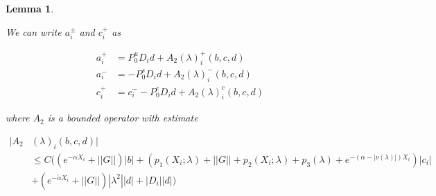 \documentclass[12pt]{article}
\newtheorem{lemma}{Lemma}
\begin{document}
\begin{lemma}\label{inv2}







We can write $a_i^\pm$ and $c_i^+$ as 

\begin{align*}
a_i^+ &= P^u_0 D_i d + A_2(\lambda)_i^+(b, c, d) \\
a_i^- &= -P^s_0 D_i d + A_2(\lambda)_i^-(b, c, d) \\
c_i^+ &= c_i^- - P^c_0 D_i d + A_2(\lambda)_i^c(b, c, d)
\end{align*}

where $A_2$ is a bounded operator with estimate

\begin{align*}
|A_2&(\lambda)_i(b, c, d)| \\
&\leq C \Big( (e^{-\alpha X_i} + ||G||)|b| + (p_1(X_i; \lambda) + ||G|| + p_2(X_i; \lambda) + p_3(\lambda) + e^{-(\alpha - |\nu(\lambda)|)X_i})|c_i| \\
&+ (e^{-\tilde{\alpha} X_i} + ||G||) |\lambda^2| |d| + |D_i||d|\Big)
\end{align*}


\end{lemma}
\end{document}
